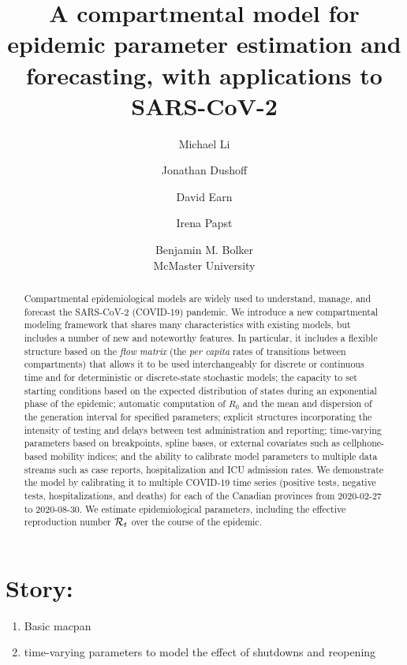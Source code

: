 \documentclass[12pt]{article}\usepackage[]{graphicx}\usepackage[]{color}
\title{A compartmental model for epidemic parameter estimation and forecasting, with applications to SARS-CoV-2}
\author{Michael Li \and Jonathan Dushoff \and David Earn \and Irena Papst \and Benjamin M. Bolker \\
  McMaster University\\
}
\begin{document}
\linenumbers
\maketitle

\section*{Story:}
\begin{enumerate}
\item{Basic macpan}
\item{time-varying parameters to model the effect of shutdowns and reopening}
\end{enumerate}

\begin{abstract}
Compartmental epidemiological models are widely used to understand, manage, and forecast the SARS-CoV-2 (COVID-19) pandemic. 
We introduce a new compartmental modeling framework that shares many characteristics with existing models, but includes a number of new and noteworthy features.
In particular, it includes a flexible structure based on the \emph{flow matrix} (the \emph{per capita} rates of transitions between compartments) that allows it to be used interchangeably for discrete or continuous time and for deterministic or discrete-state stochastic models; the capacity to set starting conditions based on the expected distribution of states during an exponential phase of the epidemic; automatic computation of $R_0$ and the mean and dispersion of the generation interval for specified parameters; explicit structures incorporating the intensity of testing and delays between test administration and reporting; time-varying parameters based on breakpoints, spline bases, or external covariates such as cellphone-based mobility indices; and the ability to calibrate model parameters to multiple data streams such as case reports, hospitalization and ICU admission rates.
We demonstrate the model by calibrating it to multiple COVID-19 time series (positive tests, negative tests, hospitalizations, and deaths) for each of the Canadian provinces from 2020-02-27 to 2020-08-30.  
We estimate epidemiological parameters, including the effective reproduction number ${\mathcal R}_t$ over the course of the epidemic.
\end{abstract}

\end{document}
